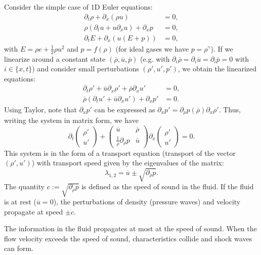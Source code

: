 \documentclass{article}
\begin{document}
Consider the simple case of 1D Euler equations:
\begin{align*}
	\partial_t \rho + \partial_x (\rho u) & = 0,                           \\
	\rho\left(\partial_t u + u \partial_x u\right) + \partial_x p & = 0,                           \\
	\partial_t E + \partial_x (u(E + p)) & = 0,
\end{align*}
with $E = \rho e + \frac{1}{2} \rho u^2$ and $p = f(\rho)$ (for ideal gases we have $p = \rho^\gamma$). If we linearize around a constant state $(\overline{\rho}, \overline{u}, \overline{p})$ (e.g. with $\partial_i \overline{\rho} = \partial_i \overline{u} = \partial_i \overline{p} = 0$ with $i\in\{x,t\})$ and consider small perturbations $(\rho', u', p')$, we obtain the linearized equations:
\begin{align*}
	\partial_t \rho' + \overline{u} \partial_x \rho' + \overline{\rho} \partial_x u' & = 0,                           \\
	\overline{\rho}\left(\partial_t u' + \overline{u} \partial_x u'\right) + \partial_x p' & = 0.                          
\end{align*}
Using Taylor, note that $\partial_x p'$ can be expressed as $\partial_x p' = \partial_\rho p (\overline{\rho}) \partial_x \rho'$. Thus, writing the system in matrix form, we have
$$
	\partial_t \begin{pmatrix}
		\rho' \\
		u'
	\end{pmatrix} + \begin{pmatrix}
		\overline{u} & \overline{\rho} \\
		\frac{1}{\overline{\rho}} \partial_\rho p & \overline{u}
	\end{pmatrix} \partial_x \begin{pmatrix}
		\rho' \\
		u'
	\end{pmatrix} = 0.
$$
This system is in the form of a transport equation (transport of the vector $(\rho', u') $) with transport speed given by the eigenvalues of the matrix:
$$\lambda_{1,2} = \overline{u} \pm \sqrt{\partial_\rho p}.$$
The quantity $c := \sqrt{\partial_\rho p}$ is defined as the speed of sound in the fluid. If the fluid is at rest ($\overline{u} = 0$), the perturbations of density (pressure waves) and velocity propagate at speed $\pm c$. 

The information in the fluid propagates at most at the speed of sound. When the flow velocity exceeds the speed of sound, characteristics collide and shock waves can form.
\end{document}
